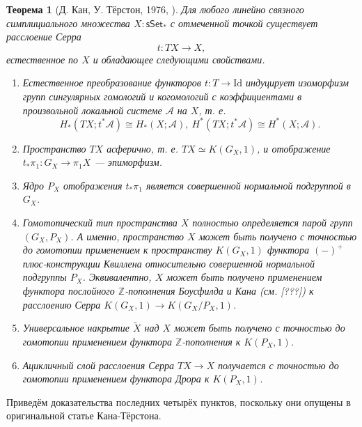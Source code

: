 \documentclass[14pt, dvipsnames]{extarticle}
\newtheorem{theorem}{Теорема}
\theoremstyle{definition}
\theoremstyle{remark}
\begin{document}
\begin{theorem}[Д. Кан, У. Тёрстон, 1976, \cite{Kan}]
Для любого линейно связного симплициального множества $X: \mathsf{sSet}_\ast$ с отмеченной точкой существует расслоение Серра $$t: TX\to X,$$ естественное по $X$ и обладающее следующими свойствами.

\begin{enumerate}[$($i$)$]
\item Естественное преобразование функторов $t: T\to \mathrm{Id}$ индуцирует изоморфизм групп сингулярных гомологий и когомологий с коэффициентами в произвольной локальной системе $\mathcal{A}$ на $X$, т. е. $$H_\ast(TX; t^\ast\mathcal{A})\cong H_\ast(X; \mathcal{A}),\ H^\ast(TX; t^\ast\mathcal{A})\cong H^\ast(X; \mathcal{A}).$$

\item Пространство $TX$ асферично, т. е. $TX\simeq K(G_X, 1)$, и отображение $t_\ast\pi_1: G_X \to \pi_1X$ --- эпиморфизм.

\item Ядро $P_X$ отображения $t_\ast\pi_1$ является совершенной нормальной подгруппой в $G_X$.

\item Гомотопический тип пространства $X$ полностью определяется парой групп $(G_X, P_X)$. А именно, пространство $X$ может быть получено с точностью до гомотопии применением к пространству $K(G_X, 1)$ функтора $(-)^+$ плюс-конструкции Квиллена относительно совершенной нормальной подгруппы $P_X$. Эквивалентно, $X$ может быть получено применением функтора послойного $\mathbb{Z}$-пополнения Боусфилда и Кана (см. [???]) к расслоению Серра $K(G_X, 1)\to K(G_X/P_X, 1)$.

\item Универсальное накрытие $\widetilde{X}$ над $X$ может быть получено с точностью до гомотопии применением функтора $\mathbb{Z}$-пополнения к $K(P_X, 1)$.

\item Ацикличный слой расслоения Серра $TX\to X$ получается с точностью до гомотопии применением функтора Дрора к $K(P_X, 1)$.    
\end{enumerate}
\end{theorem}



Приведём доказательства последних четырёх пунктов, поскольку они опущены в оригинальной статье Кана-Тёрстона.
\end{document}
